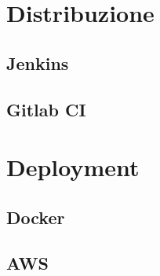 \section{Distribuzione}
\subsection{Jenkins}
\kant[5]
\subsection{Gitlab CI}
\kant[5]

\section{Deployment}
\subsection{Docker}
\kant[5]
\subsection{AWS}
\kant[5]

